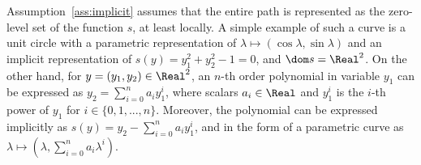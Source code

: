Assumption~\ref{ass:implicit} assumes that the entire path is represented as
the zero-level set of the function $s$, at least locally. A simple example of such a curve is a unit circle with a parametric representation of $\lambda\mapsto(\cos \lambda,\sin\lambda)$ and an implicit representation of $s(y) = y_1^2 + y_2^2 - 1 = 0$,  {and $\dom s = \Real^2$. On the other hand, for $y = (y_1,y_2)\in\Real^2$, an $n$-th order polynomial in variable $y_1$ can be expressed as $y_2 = \sum_{i=0}^{n} a_iy_1^i$, where  scalars $a_i\in\Real$ and $y_1^i$ is the $i$-th power of $y_1$ for $i \in \{0, 1,..., n\}$. Moreover, the polynomial can be expressed implicitly as $s(y) = y_2 - \sum_{i=0}^{n} a_iy_1^i$, and in the form of a parametric curve as $\lambda\mapsto(\lambda,\sum_{i=0}^{n} a_i\lambda^i)$}. 

